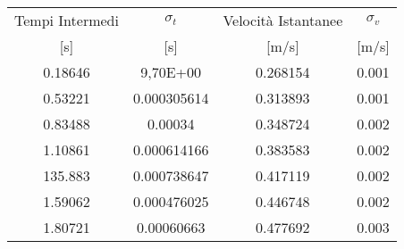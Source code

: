 \documentclass[a4paper,11pt,oneside]{article}
\begin{document}
\begin{table}[h!]
\begin{tabular}{c|c|c|c}
    \toprule
    Tempi Intermedi & $\sigma_t$ & Velocità Istantanee & $\sigma_v$ \\
    {[}s{]} & [s] & [m/s] & [m/s]\\
    \midrule
    0.18646 & 9,70E+00 & 0.268154 & 0.001 \\
    0.53221 & 0.000305614 & 0.313893 & 0.001 \\
    0.83488 & 0.00034 & 0.348724 & 0.002 \\
    1.10861 & 0.000614166 & 0.383583 & 0.002 \\
    135.883 & 0.000738647 & 0.417119 & 0.002 \\
    1.59062 & 0.000476025 & 0.446748 & 0.002 \\
    1.80721 & 0.00060663 & 0.477692 & 0.003 \\
    \bottomrule
\end{tabular}
\label{tab:45primi_p}
\end{table}
\end{document}
